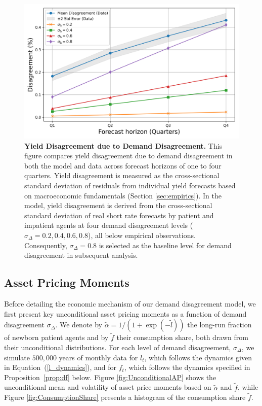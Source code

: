 \documentclass[preprint,11pt,authoryear]{elsarticle}
\theoremstyle{plain}
\begin{document}
\begin{figure}[htbp]
\centering
\vspace{0.1in}
\includegraphics[width=.5\textwidth]{figuresJFE/MeanDisagreementDataAndModel.png} 
\caption{\textbf{Yield Disagreement due to Demand Disagreement.} \footnotesize{This figure compares yield disagreement due to demand disagreement in both the model and data across forecast horizons of one to four quarters. Yield disagreement is measured as the cross-sectional standard deviation of residuals from individual yield forecasts based on macroeconomic fundamentals (Section \ref{sec:empirics}). In the model, yield disagreement is derived from the cross-sectional standard deviation of real short rate forecasts by patient and impatient agents at four demand disagreement levels ($\sigma_{\Delta}= 0.2, 0.4, 0.6, 0.8$), all below empirical observations. Consequently, $\sigma_{\Delta}=0.8$ is selected as the baseline level for demand disagreement in subsequent analysis.}} \label{fig:DemandDisagreementYieldModelAndData} 
\end{figure}

 

 
\subsection{Asset Pricing Moments}\label{sec:APmoments}  

Before detailing the economic mechanism of our demand disagreement model, we first present key unconditional asset pricing moments as a function of demand disagreement $\sigma_{\Delta}$. We denote by $\tilde{\alpha}  = 1/(1+\exp(-\tilde{l}))$ the long-run fraction of newborn patient agents and by $\tilde{f}$ their consumption share, both drawn from their unconditional distributions. For each level of demand disagreement, $\sigma_{\Delta}$, we simulate $500,000$ years of monthly data for $l_t$, which follows the dynamics given in Equation~(\ref{l_dynamics}), and for $f_t$, which follows the dynamics specified in Proposition~\ref{prop:df} below. Figure \ref{fig:UnconditionalAP} shows the unconditional mean and volatility of asset price moments based on $\tilde{\alpha}$ and $\tilde{f}$, while Figure \ref{fig:ConsumptionShare} presents a histogram of the consumption share $\tilde{f}$.  
\end{document}
